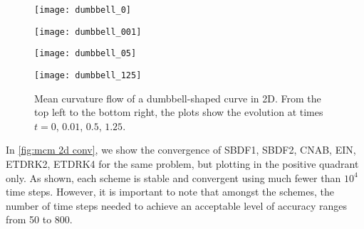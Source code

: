 \begin{figure}[htb!]
        \centering
\begin{minipage}{0.48\textwidth}
        \texttt{[image: dumbbell\_0]}
\end{minipage}%
\begin{minipage}{0.48\textwidth}
        \texttt{[image: dumbbell\_001]}
\end{minipage}
\begin{minipage}{0.48\textwidth}
        \texttt{[image: dumbbell\_05]}
\end{minipage}%
\begin{minipage}{0.48\textwidth}
        \texttt{[image: dumbbell\_125]}
\end{minipage}%
\caption[Mean curvature flow of a dumbbell-shaped curve in 2D]{Mean curvature flow of a dumbbell-shaped curve in 2D. From the top left to the bottom right, the plots show the evolution at times $t=0$, $0.01$, $0.5$, $1.25$.}
\label{fig:mcm 2d dumbbell}
\end{figure}

In \cref{fig:mcm 2d conv}, we show the convergence of SBDF1, SBDF2, CNAB, EIN, ETDRK2, ETDRK4 for the same problem, but plotting in the positive quadrant only. As shown, each scheme is stable and convergent using much fewer than $10^4$ time steps. However, it is important to note that amongst the schemes, the number of time steps needed to achieve an acceptable level of accuracy ranges from 50 to 800. 

